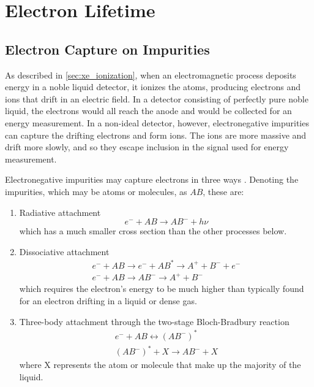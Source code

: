 \documentclass[herrin-thesis.tex]{subfiles}
\begin{document}
\chapter{Electron Lifetime}
\label{ch:electronlifetime}

\section{Electron Capture on Impurities}
As described in \cref{sec:xe_ionization}, when an electromagnetic process deposits energy in a noble liquid detector, it ionizes the atoms, producing electrons and ions that drift in an electric field. In a detector consisting of perfectly pure noble liquid, the electrons would all reach the anode and would be collected for an energy measurement. In a non-ideal detector, however, electronegative impurities can capture the drifting electrons and form ions. The ions are more massive and drift more slowly, and so they escape inclusion in the signal used for energy measurement.

Electronegative impurities may capture electrons in three ways \cite{Aprile:2006fk}. Denoting the impurities, which may be atoms or molecules, as \(AB\), these are:
\begin{enumerate}
\item Radiative attachment
\begin{equation}
e^{-} + AB \rightarrow AB^{-} + h \nu
\end{equation}
which has a much smaller cross section than the other processes below.
\item Dissociative attachment
\begin{equation}
\begin{split}
e^{-} + AB \rightarrow e^{-} + AB^{*} \rightarrow A^{+} + B^{-} + e^{-} \\
e^{-} + AB \rightarrow AB^{-} \rightarrow A^{+} + B^{-}
\end{split}
\end{equation}
which requires the electron's energy to be much higher than typically found for an electron drifting in a liquid or dense gas.
\item Three-body attachment through the two-stage Bloch-Bradbury reaction
\begin{equation}
\begin{split}
e^{-} + AB \leftrightarrow (AB^{-})^{*} \\
(AB^{-})^{*} + X \rightarrow AB^{-} + X
\end{split}
\label{eq:el_3bodyattachment}
\end{equation}
where X represents the atom or molecule that make up the majority of the liquid.
\end{enumerate}
\end{document}
